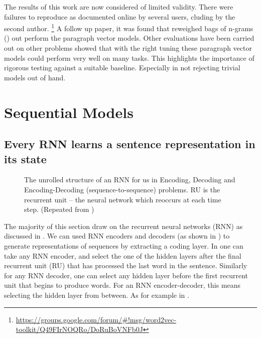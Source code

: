 \documentclass[12pt,parskip]{komatufte}
\begin{document}


The results of this work are now considered of limited validity.
There were failures to reproduce as documented online by several users,
cluding by the second author.
 \footnote{ \url{https://groups.google.com/forum/\#!msg/word2vec-toolkit/Q49FIrNOQRo/DoRuBoVNFb0J}}
A follow up paper,  it was found that reweighed bags of n-grams \pcite() out perform the paragraph vector models.
Other evaluations have been carried out on other problems \textcite{lau2016doc2vecissues} showed that with the right tuning these paragraph vector models could perform very well on many tasks.
This highlights the importance of rigorous testing against a suitable baseline.
Especially in not rejecting trivial models out of hand.






\section{Sequential Models}

\subsection{Every RNN learns a sentence representation in its state}
\begin{figure}
	\caption{The unrolled structure of an RNN for us in Encoding, Decoding and Encoding-Decoding (sequence-to-sequence) problems. RU is the recurrent unit -- the neural network which reoccurs at each time step. (Repeated from )
	}
	
	\label{fig-rnns-sq}
	
	\resizebox{\textwidth}{!}{}
\end{figure}

The majority of this section draw on the recurrent neural networks (RNN) as discussed in .
We can used RNN encoders and decoders (as shown in ) to generate representations of sequences by extracting a coding layer.
In one can take any RNN encoder,
and select the one of the hidden layers after the final recurrent unit (RU) that has processed the last word in the sentence.
Similarly for any RNN decoder, one can select any hidden layer before the first recurrent unit that begins to produce words.
For an RNN encoder-decoder, this means selecting the hidden layer from between.
As for example in .
\end{document}
